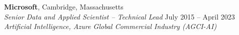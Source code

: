 \documentclass[letterpaper,11pt]{nih}
\begin{document}
% 
% 
% 

\textbf{Microsoft}, Cambridge, Massachusetts\\
{\em Senior Data and Applied Scientist -- Technical Lead} \hfill {July 2015 -- April 2023}\\
{\em Artificial Intelligence, Azure Global Commercial Industry (AGCI-AI) }\\
\end{document}
